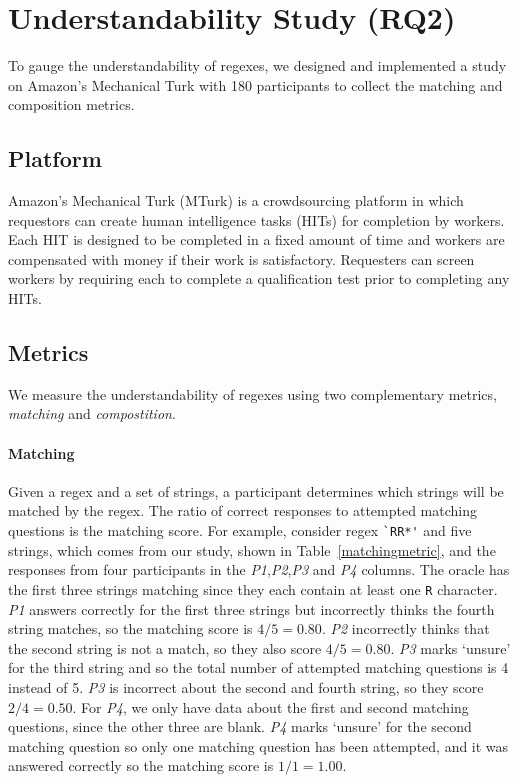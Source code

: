 \section{Understandability Study (RQ2)}
\label{sec:understandability}
To gauge the understandability of regexes, we designed and implemented a study on Amazon's Mechanical Turk with 180 participants to collect the matching and composition metrics.

\subsection{Platform}
Amazon's Mechanical Turk (MTurk) is a crowdsourcing platform in which requestors can create human intelligence tasks (HITs) for completion by workers. Each HIT is designed to be completed in a fixed amount of time and workers are compensated with money if their work is satisfactory. Requesters can screen workers by requiring each to complete a qualification test prior to completing any HITs.

\subsection{Metrics}
\label{sec:understadningmetric}
 We measure the understandability of regexes using two complementary metrics, \emph{matching} and \emph{compostition}.


\paragraph{Matching}
 Given a regex and a set of strings, a participant determines which strings will be matched by the regex. The ratio of correct responses to attempted matching questions is the matching score. For example, consider regex \verb!`RR*'! and five strings, which comes from our study, shown in Table~\ref{matchingmetric}, and the responses from four participants in the \emph{P1},\emph{P2},\emph{P3} and \emph{P4} columns. The oracle has the first three strings matching since they each contain at least one \verb!R! character. \emph{P1} answers correctly for the first three strings but incorrectly thinks the fourth string matches, so the matching score is $4/5 = 0.80$. \emph{P2} incorrectly thinks that the second string is not a match, so they also score $4/5 = 0.80$.  \emph{P3} marks `unsure' for the third string and so the total number of attempted matching questions is 4 instead of 5. \emph{P3} is incorrect about the second and fourth string, so they score $2/4 = 0.50$.  For \emph{P4}, we only have data about the first and second matching questions, since the other three are blank.  \emph{P4} marks `unsure' for the second matching question so only one matching question has been attempted, and it was answered correctly so the matching score is $1/1 = 1.00$.


